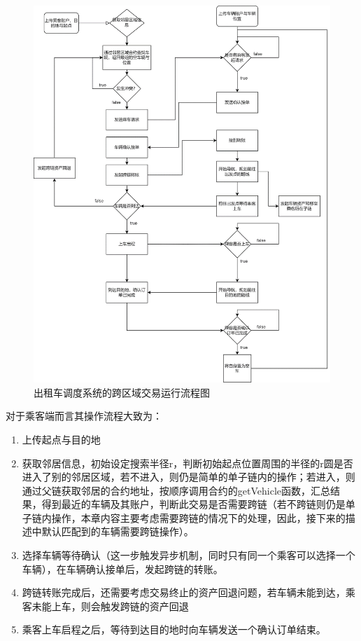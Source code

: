 \begin{figure}
	\centering
	\includegraphics[width=\textwidth]{figures/出租车调度系统的跨链交易运行流程图.png}
	\caption{出租车调度系统的跨区域交易运行流程图}
	\label{fig:出租车调度系统的跨区域交易运行流程图}
\end{figure}

对于乘客端而言其操作流程大致为：

\begin{enumerate}
    \item 上传起点与目的地
    \item 获取邻居信息，初始设定搜索半径r，判断初始起点位置周围的半径的r圆是否进入了别的邻居区域，若不进入，则仍是简单的单子链内的操作；若进入，则通过父链获取邻居的合约地址，按顺序调用合约的getVehicle函数，汇总结果，得到最近的车辆及其账户，判断此交易是否需要跨链（若不跨链则仍是单子链内操作，本章内容主要考虑需要跨链的情况下的处理，因此，接下来的描述中默认匹配到的车辆需要跨链操作）。
    \item 选择车辆等待确认（这一步触发异步机制，同时只有同一个乘客可以选择一个车辆），在车辆确认接单后，发起跨链的转账。
    \item 跨链转账完成后，还需要考虑交易终止的资产回退问题，若车辆未能到达，乘客未能上车，则会触发跨链的资产回退
    \item 乘客上车启程之后，等待到达目的地时向车辆发送一个确认订单结束。
\end{enumerate}

